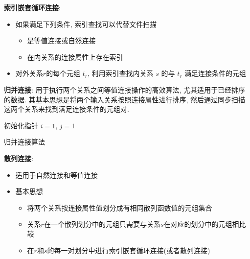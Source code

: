 \textbf{索引嵌套循环连接}:
\begin{itemize}
    \item 如果满足下列条件, 索引查找可以代替文件扫描
    \begin{itemize}
        \item 是等值连接或自然连接
        \item 在内关系的连接属性上存在索引
    \end{itemize}
    \item 对外关系$ r $的每个元组 $t_r$, 利用索引查找内关系 $s$ 的与 $t_r$ 满足连接条件的元组
\end{itemize}

\textbf{归并连接}: 用于执行两个关系之间等值连接操作的高效算法, 尤其适用于已经排序的数据. 其基本思想是将两个输入关系按照连接属性进行排序, 然后通过同步扫描这两个关系来找到满足连接条件的元组对.

\begin{algorithm}[H]
    
    初始化指针 $i = 1$, $j = 1$\;
    

    \caption{归并连接算法}
\end{algorithm}

\textbf{散列连接}:
\begin{itemize}
    \item 适用于自然连接和等值连接
    \item 基本思想
    \begin{itemize}
        \item 将两个关系按连接属性值划分成有相同散列函数值的元组集合
        \item 关系$r$在一个散列划分中的元组只需要与关系$s$在对应的划分中的元组相比较
        \item 在$r$和$s$的每一对划分中进行索引嵌套循环连接(或者散列连接)
    \end{itemize}
\end{itemize}


